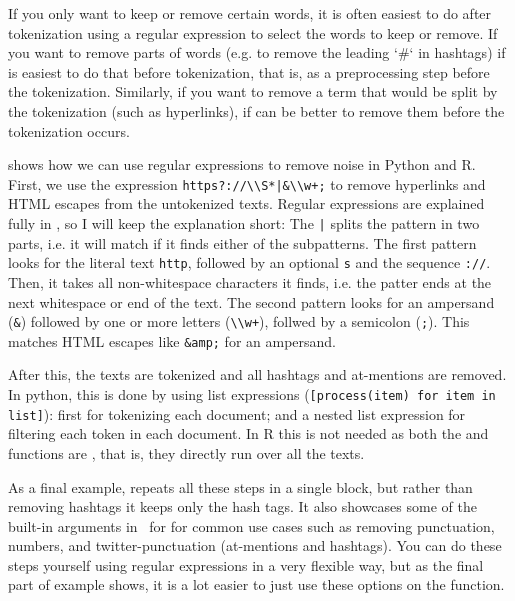 If you only want to keep or remove certain words, it is often easiest to do after tokenization
using a regular expression to select the words to keep or remove.
If you want to remove parts of words (e.g. to remove the leading `\#` in hashtags) if is easiest to do that before tokenization,
that is, as a preprocessing step before the tokenization.
Similarly, if you want to remove a term that would be split by the tokenization (such as hyperlinks),
if can be better to remove them before the tokenization occurs.

 shows how we can use regular expressions to remove noise in Python and R.
First, we use the expression \verb#https?://\\S*|&\\w+;# to remove hyperlinks and HTML escapes from the untokenized texts.
Regular expressions are explained fully in , so I will keep the explanation short:
The \verb#|# splits the pattern in two parts, i.e. it will match if it finds either of the subpatterns.
The first pattern looks for the literal text \verb#http#, followed by an optional \verb#s# and the sequence \verb#://#.
Then, it takes all non-whitespace characters it finds, i.e. the patter ends at the next whitespace or end of the text.
The second pattern looks for an ampersand (\verb#&#) followed by one or more letters (\verb#\\w+#), follwed by a semicolon (\verb#;#).
This matches HTML escapes like \verb#&amp;# for an ampersand.

After this, the texts are tokenized and all hashtags and at-mentions are removed.
In python, this is done by using list expressions (\verb#[process(item) for item in list]#): first for tokenizing each document; and a nested list expression for filtering each token in each document.
In R this is not needed as both the  and  functions are , that is, they directly run over all the texts.

As a final example,  repeats all these steps in a single block, but rather than removing hashtags it keeps only the hash tags.
It also showcases some of the built-in arguments in \quanteda\ for 
for common use cases such as removing
punctuation, numbers, and twitter-punctuation (at-mentions and hashtags).
You can do these steps yourself using regular expressions in a very flexible way, but as the final part of example 
shows, it is a lot easier to just use these options on the  function. 


